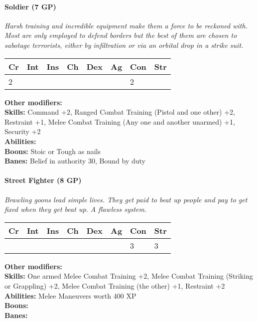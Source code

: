 \paragraph*{Soldier (7 GP)}
\textit{Harsh training and incredible equipment make them a force to be reckoned with. Most are only employed to defend borders but the best of them are chosen to sabotage terrorists, either by infiltration or via an orbital drop in a strike suit.}\par
\begin{tabular}{|l|l|l|l|l|l|l|l|}
	\hline
	Cr & Int & Ins & Ch & Dex & Ag & Con & Str \\ \hline
	2 &  &  &  &  &  & 2 &  \\ \hline
\end{tabular}\par
\noindent\textbf{Other modifiers:} \\
\textbf{Skills:} Command +2,
Ranged Combat Training (Pistol and one other) +2,
Restraint +1,
Melee Combat Training (Any one and another unarmed) +1,
Security +2\\
\textbf{Abilities:} \\
\textbf{Boons:} Stoic or Tough as nails\\
\textbf{Banes:} Belief in authority 30,
Bound by duty\\

\hrulefill
\paragraph*{Street Fighter (8 GP)}
\textit{Brawling goons lead simple lives. They get paid to beat up people and pay to get fixed when they get beat up. A flawless system.}\par
\begin{tabular}{|l|l|l|l|l|l|l|l|}
    \hline
    Cr & Int & Ins & Ch & Dex & Ag & Con & Str \\ \hline
    &  &  &  &  &  & 3 & 3 \\ \hline
\end{tabular}\par
\noindent\textbf{Other modifiers:} \\
\textbf{Skills:} One armed Melee Combat Training +2,
Melee Combat Training (Striking or Grappling) +2,
Melee Combat Training (the other) +1,
Restraint +2\\
\textbf{Abilities:} Melee Maneuvers worth 400 XP\\
\textbf{Boons:} \\
\textbf{Banes:} \\

